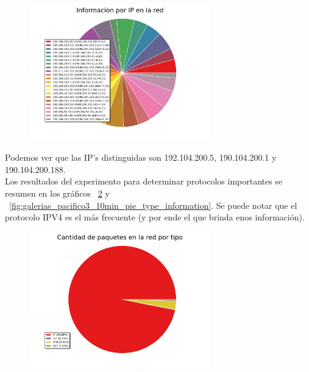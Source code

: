 \begin{figure}[h!]
  \centering
   \includegraphics[width=0.7\textwidth]{graficos/galerias_pacifico3_10min_pie_arp_information.png}
  \caption{}
  \label{fig:galerias_pacifico3_10min_pie_arp_information}
\end{figure}

Podemos ver que las IP's distinguidas son 192.104.200.5, 190.104.200.1 y 190.104.200.188. 
\\

Los resultados del experimento para determinar protocolos importantes se resumen en los gráficos ~\ref{fig:galerias_pacifico3_10min_pie_type} y ~\ref{fig:galerias_pacifico3_10min_pie_type_information}. Se puede notar que el protocolo IPV4 es el más frecuente (y por ende el que brinda enos información).

\begin{figure}[h!]
  \centering
   \includegraphics[width=0.7\textwidth]{graficos/galerias_pacifico3_10min_pie_type.png}
  \caption{}
  \label{fig:galerias_pacifico3_10min_pie_type}
\end{figure}

